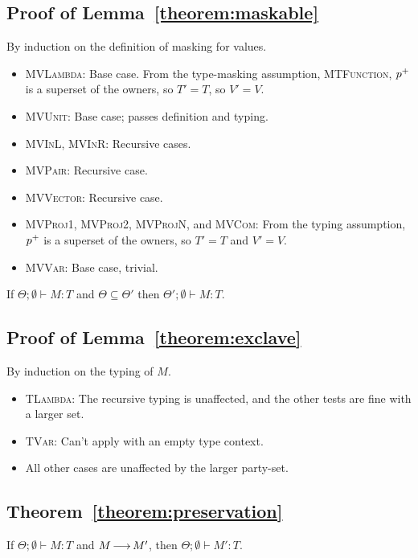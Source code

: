 \subsection{Proof of Lemma~\ref{theorem:maskable}}
By induction on the definition of masking for values.
\begin{itemize}
\item \textsc{MVLambda}: Base case. From the type-masking assumption, \textsc{MTFunction},
  ${p^{+}}$ is a superset of the owners,
  so $T' = T$, so $V' = V$.
\item \textsc{MVUnit}: Base case; passes definition and typing.
\item \textsc{MVInL}, \textsc{MVInR}: Recursive cases.
\item \textsc{MVPair}: Recursive case.
\item \textsc{MVVector}: Recursive case.
\item \textsc{MVProj1}, \textsc{MVProj2}, \textsc{MVProjN}, and \textsc{MVCom}:
  From the typing assumption, ${p^{+}}$ is a superset of the owners,
  so $T' = T$ and $V' = V$.
\item \textsc{MVVar}: Base case, trivial.
\end{itemize}

\begin{lemma}[Exclave]\label{theorem:exclave}
  If $Θ;∅ ⊢ M : T$ and $Θ \subseteq Θ'$
  then $Θ';∅ ⊢ M : T$.
\end{lemma}
\subsection{Proof of Lemma~\ref{theorem:exclave}}
By induction on the typing of $M$.
\begin{itemize}
\item \textsc{TLambda}: The recursive typing is unaffected,
  and the other tests are fine with a larger set.
\item \textsc{TVar}: Can't apply with an empty type context.
\item All other cases are unaffected by the larger party-set.
\end{itemize}


\subsection{Theorem~\ref{theorem:preservation}}

\begin{theorem}[Preservation]\label{theorem:preservation}
  If $Θ;∅ ⊢ M : T$ and $M \operatorname{\longrightarrow} M'$, then $Θ;∅ ⊢ M' : T$.
\end{theorem}

